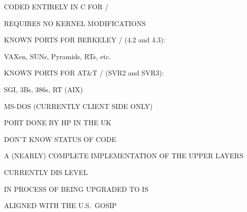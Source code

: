 \begin{bwslide}

\begin{nrtc}
\item	CODED ENTIRELY IN C FOR \unix/
    \begin{nrtc}
    \item	REQUIRES NO KERNEL MODIFICATIONS    
    \end{nrtc}

\item	KNOWN PORTS FOR BERKELEY \unix/ (4.2 and 4.3):
    \begin{nrtc}
    \item	VAXen, SUNs, Pyramids, RTs, etc.
    \end{nrtc}

\item	KNOWN PORTS FOR AT\&T \unix/ (SVR2 and SVR3):
    \begin{nrtc}
    \item	SGI, 3Bs, 386s, RT (AIX)
    \end{nrtc}

\item	MS-DOS (CURRENTLY CLIENT SIDE ONLY)
    \begin{nrtc}
    \item	PORT DONE BY HP IN THE UK

    \item	DON'T KNOW STATUS OF CODE
    \end{nrtc}
\end{nrtc}
\end{bwslide}


\begin{bwslide}

\begin{nrtc}
\item	A (NEARLY) COMPLETE IMPLEMENTATION OF THE UPPER LAYERS

\item	CURRENTLY DIS LEVEL
    \begin{nrtc}
    \item	IN PROCESS OF BEING UPGRADED TO IS
    \end{nrtc}

\item	ALIGNED WITH THE U.S.~GOSIP
\end{nrtc}
\end{bwslide}




